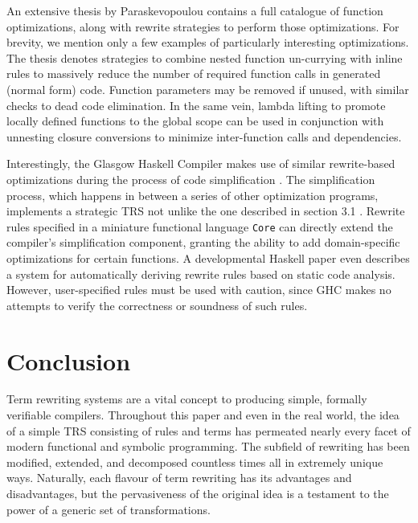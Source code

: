 \documentclass{article}
\begin{document}
An extensive thesis by Paraskevopoulou \cite{paraskevopoulou2020verified} contains a full catalogue of function optimizations,
along with rewrite strategies to perform those optimizations.
For brevity, we mention only a few examples of particularly interesting optimizations.
The thesis denotes strategies to combine nested function un-currying with inline rules
to massively reduce the number of required function calls in generated (normal form) code.
Function parameters may be removed if unused, with similar checks to dead code elimination.
In the same vein, lambda lifting to promote locally defined functions to the global scope can be used in conjunction with unnesting closure conversions
to minimize inter-function calls and dependencies.

Interestingly, the Glasgow Haskell Compiler makes use of similar rewrite-based optimizations during the process of code simplification \cite{brown2011architecture}.
The simplification process, which happens in between a series of other optimization programs, implements a strategic TRS not unlike the one described in section 3.1 .
Rewrite rules specified in a miniature functional language \texttt{Core} can directly extend the compiler's simplification component,
granting the ability to add domain-specific optimizations for certain functions.
A developmental Haskell paper \cite{peytonjones2001playing} even describes a system for automatically deriving rewrite rules based on static code analysis.
However, user-specified rules must be used with caution,
since GHC makes no attempts to verify the correctness or soundness of such rules.

\section{Conclusion}

Term rewriting systems are a vital concept to producing simple, formally verifiable compilers.
Throughout this paper and even in the real world, the idea of a simple TRS consisting of rules and terms
has permeated nearly every facet of modern functional and symbolic programming. The subfield of rewriting has been modified, extended, and decomposed
countless times all in extremely unique ways. Naturally, each flavour of term rewriting has its advantages and disadvantages, but the pervasiveness of the original idea
is a testament to the power of a generic set of transformations.
\end{document}
